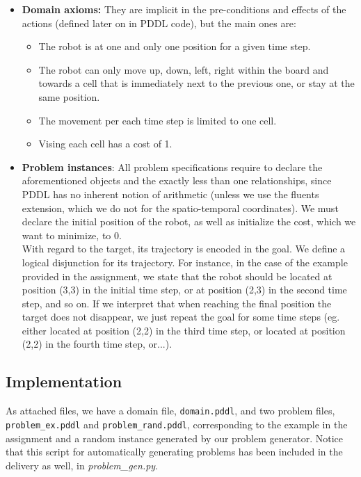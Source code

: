 \documentclass{article}
\begin{document}
\begin{enumerate}
\begin{itemize}
\begin{itemize}
\begin{itemize}
        \end{itemize}
    \end{itemize}
    \item \textbf{Domain axioms:} They are implicit in the pre-conditions and effects of the actions (defined later on in PDDL code), but the main ones are:
        \begin{itemize}
            \item The robot is at one and only one position for a given time step.
            \item The robot can only move up, down, left, right within the board and towards a cell that is immediately next to the previous one, or stay at the same position.
            \item The movement per each time step is limited to one cell.
            \item Vising each cell has a cost of 1.
        \end{itemize}
    \item \textbf{Problem instances}: All problem specifications require to declare the aforementioned objects and the exactly less than one relationships, since PDDL has no inherent notion of arithmetic (unless we use the fluents extension, which we do not for the spatio-temporal coordinates). We must declare the initial position of the robot, as well as initialize the cost, which we want to minimize, to 0. \\With regard to the target, its trajectory is encoded in the goal. We define a logical disjunction for its trajectory. For instance, in the case of the example provided in the assignment, we state that the robot should be located at position (3,3) in the initial time step, or at position (2,3) in the second time step, and so on. If we interpret that when reaching the final position the target does not disappear, we just repeat the goal for some time steps (eg. either located at position (2,2) in the third time step, or located at position (2,2) in the fourth time step, or...). 
\end{itemize}

\subsection*{Implementation}

As attached files, we have a domain file, \texttt{domain.pddl}, and two problem files, \texttt{problem\_ex.pddl} and \texttt{problem\_rand.pddl}, corresponding to the example in the assignment and a random instance generated by our problem generator. Notice that this script for automatically generating problems has been included in the delivery as well, in \textit{problem\_gen.py}.


\end{enumerate}
\end{document}
